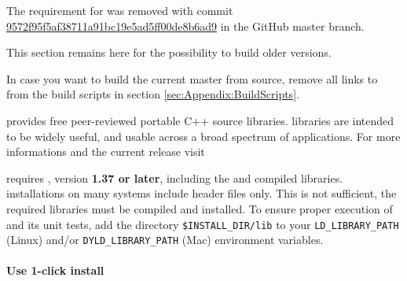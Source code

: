 % 
%               
%          
% 

\leveldown{\texorpdfstring{\protect\marktool{\boostname}}{\boostname{}}}

\begin{warning}
The requirement for \marktool{\boostname} was removed with commit\\
\href{https://github.com/peridigm/peridigm/commit/9572f95f5af38711a91bc19e5ad5ff00de8b6ad9}{9572f95f5af38711a91bc19e5ad5ff00de8b6ad9} in the GitHub master branch.

This section remains here for the possibility to build older \marktool{\toolname} versions.

In case you want to build the current master from source, remove all links to \marktool{\boostname} from the build scripts in section \ref{sec:Appendix:BuildScripts}. 
\end{warning}

\marktool{\boostname} provides free peer-reviewed portable C++ source libraries. \marktool{\boostname} libraries are intended to be widely useful, and usable across a broad spectrum of applications. For more informations and the current release visit

\href{\boostaddress}{\boostaddress}

\marktool{\toolname} requires \marktool{\boostname}, version \textbf{1.37 or later}, including the  and  compiled libraries. \marktool{\boostname} installations on many systems include header files only.  This is not sufficient, the required libraries must be compiled and installed. To ensure proper execution of \marktool{\toolname} and its unit tests, add the \marktool{\boostname} directory \verb+$INSTALL_DIR/lib+ to your \verb+LD_LIBRARY_PATH+ (Linux) and/or \verb+DYLD_LIBRARY_PATH+ (Mac) environment variables.

\paragraph{Use 1-click install}

